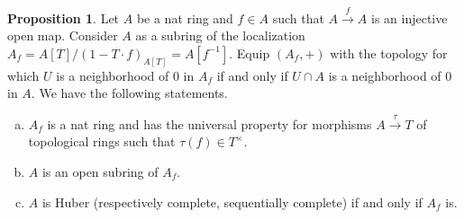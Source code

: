 \documentclass[10pt]{article}
\numberwithin{equation}{section}
\theoremstyle{definition}
\newtheorem{proposition}{Proposition}[subsection]
\begin{document}
\begin{proposition}
    \label{proposition_18_2}
    Let $A$ be a nat ring and $f\in A$ such that $A\stackrel{f}{\to}A$ is an injective open map. Consider $A$ as a subring of the localization $A_f = A[T]/(1-T\cdot f)_{A[T]} = A[f^{-1}]$. Equip $(A_f,+)$ with the topology for which $U$ is a neighborhood of $0$ in $A_f$ if and only if $U\cap A$ is a neighborhood of $0$ in $A$. We have the following statements.
    \begin{enumerate}[a.]
        \item $A_f$ is a nat ring and has the universal property for morphisms $A\stackrel{\tau}{\to}T$ of topological rings such that $\tau(f)\in T^\times$.
        \item $A$ is an open subring of $A_f$.
        \item $A$ is Huber (respectively complete, sequentially complete) if and only if $A_f$ is.
    \end{enumerate}
\end{proposition}
\end{document}
